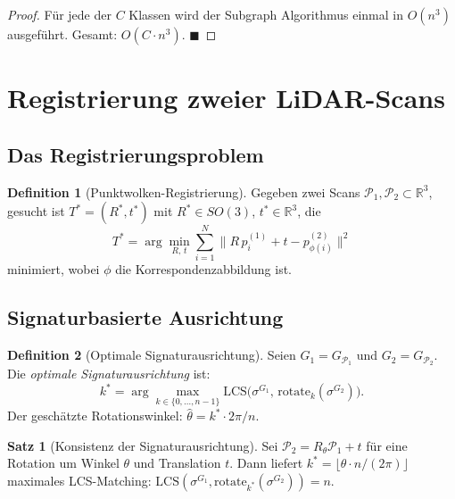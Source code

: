 ﻿\documentclass[a4paper,12pt]{article}
\theoremstyle{definition}
\newtheorem{definition}{Definition}[section]
\newtheorem{satz}{Satz}[section]
\begin{document}
\begin{proof}
  Für jede der $C$ Klassen wird der Subgraph Algorithmus einmal in
  $O(n^3)$ ausgeführt. Gesamt: $O(C \cdot n^3)$. \hfill$\blacksquare$
\end{proof}

\section{Registrierung zweier LiDAR-Scans}

\subsection{Das Registrierungsproblem}

\begin{definition}[Punktwolken-Registrierung]
  \label{def:registrierung}
  Gegeben zwei Scans $\mathcal{P}_1, \mathcal{P}_2 \subset
  \mathbb{R}^3$, gesucht ist $T^* = (R^*, t^*)$ mit $R^* \in SO(3)$,
  $t^* \in \mathbb{R}^3$, die
  \[
    T^* = \arg\min_{R,\, t} \sum_{i=1}^{N}
          \bigl\|R\,p_i^{(1)} + t - p_{\phi(i)}^{(2)}\bigr\|^2
  \]
  minimiert, wobei $\phi$ die Korrespondenzabbildung ist.
\end{definition}

\subsection{Signaturbasierte Ausrichtung}

\begin{definition}[Optimale Signaturausrichtung]
  \label{def:sig_ausrichtung}
  Seien $G_1 = G_{\mathcal{P}_1}$ und $G_2 = G_{\mathcal{P}_2}$.
  Die \emph{optimale Signaturausrichtung} ist:
  \[
    k^* = \arg\max_{k \in \{0,\ldots,n-1\}}
          \mathrm{LCS}\!\bigl(\sigma^{G_1},\,
          \mathrm{rotate}_k(\sigma^{G_2})\bigr).
  \]
  Der geschätzte Rotationswinkel: $\hat\theta = k^* \cdot 2\pi / n$.
\end{definition}

\begin{satz}[Konsistenz der Signaturausrichtung]
  \label{satz:reg_konsistenz}
  Sei $\mathcal{P}_2 = R_\theta \mathcal{P}_1 + t$ für eine
  Rotation um Winkel $\theta$ und Translation $t$.
  Dann liefert $k^* = \lfloor \theta \cdot n / (2\pi) \rfloor$
  maximales LCS-Matching: $\mathrm{LCS}(\sigma^{G_1},
  \mathrm{rotate}_{k^*}(\sigma^{G_2})) = n$.
\end{satz}
\end{document}
